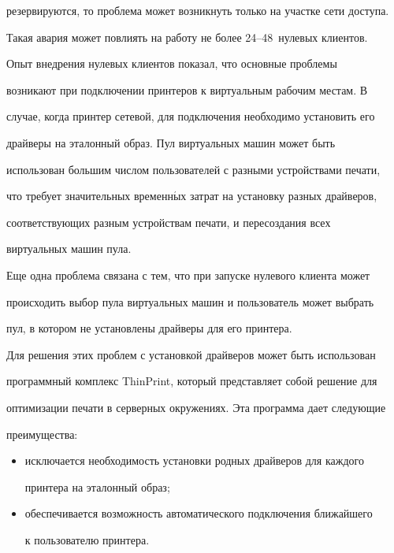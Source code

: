резервируются, то проблема может возникнуть только на участке сети доступа. 

Такая авария может повлиять на работу не более 24--48~нулевых клиентов. 

  

  Опыт внедрения нулевых клиентов показал, что основные проблемы 

возникают при подключении принтеров к виртуальным рабочим местам. В 

случае, когда принтер сетевой, для подключения необходимо установить его 

драйверы на эталонный образ. Пул виртуальных машин может быть 

использован большим числом пользователей с разными устройствами печати, 

что требует значительных временн$\acute{\mbox{ы}}$х затрат на установку разных драйверов, 

соответствующих разным устройствам печати, и пересоздания всех 

виртуальных машин пула.

  

  Еще одна проблема связана с тем, что при запуске нулевого клиента может 

происходить выбор пула виртуальных машин и пользователь может выбрать 

пул, в котором не установлены драйверы для его принтера.

  

  Для решения этих проблем с установкой драйверов может быть использован 

программный комплекс ThinPrint, который представляет собой решение для 

оптимизации печати в серверных окружениях. Эта программа дает следующие 

преимущества:

  \begin{itemize}

\item исключается необходимость установки родных драйверов для каждого 

принтера на эталонный образ;

\item обеспечивается возможность автоматического подключения ближайшего 

к пользователю принтера.

\end{itemize}

  

